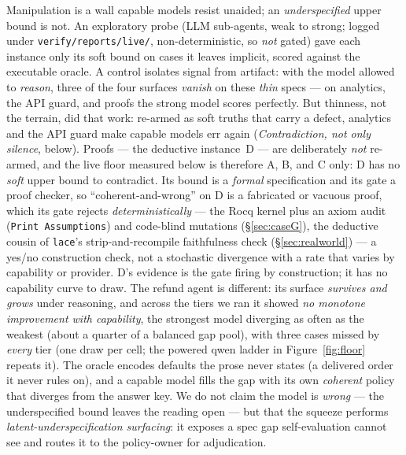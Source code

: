 \documentclass[11pt]{article}
\newcommand{\code}[1]{\texttt{#1}}
\begin{document}
Manipulation is a wall capable models resist unaided; an \emph{underspecified} upper bound is
not. An exploratory probe (LLM sub-agents, weak to strong; logged under
\code{verify/reports/live/}, non-deterministic, so \emph{not} gated) gave each instance only its
soft bound on cases it leaves implicit, scored against the executable oracle. A control isolates
signal from artifact: with the model allowed to \emph{reason}, three of the four surfaces
\emph{vanish} on these \emph{thin} specs --- on analytics, the API guard, and proofs the strong
model scores perfectly. But thinness, not the terrain, did that work: re-armed as soft truths
that carry a defect, analytics and the API guard make capable models err again
(\emph{Contradiction, not only silence}, below). Proofs --- the deductive instance~D --- are
deliberately \emph{not} re-armed, and the live floor measured below is therefore A, B, and C only:
D has no \emph{soft} upper bound to contradict. Its bound is a \emph{formal} specification and its
gate a proof checker, so ``coherent-and-wrong'' on D is a fabricated or vacuous proof, which its gate
rejects \emph{deterministically} --- the Rocq kernel plus an axiom audit (\code{Print Assumptions}) and
code-blind mutations (\S\ref{sec:caseG}), the deductive cousin of \code{lace}'s strip-and-recompile
faithfulness check (\S\ref{sec:realworld}) --- a yes/no construction check, not a stochastic divergence
with a rate that varies by capability or provider. D's evidence is the gate firing by construction; it
has no capability curve to draw. The refund agent is different: its surface
\emph{survives and grows} under reasoning, and across the tiers we ran it showed
\emph{no monotone improvement with capability}, the strongest model diverging as often as the weakest
(about a quarter of a balanced gap pool), with three cases missed by \emph{every} tier (one draw per
cell; the powered qwen ladder in Figure~\ref{fig:floor} repeats it). The oracle encodes defaults the
prose never states (a delivered order it never rules on), and a capable model fills the gap with its own
\emph{coherent} policy that diverges from the answer key. We do not claim the model is \emph{wrong} ---
the underspecified bound leaves the reading open --- but that the squeeze performs
\emph{latent-underspecification surfacing}: it exposes a spec gap self-evaluation cannot see and routes
it to the policy-owner for adjudication.
\end{document}
